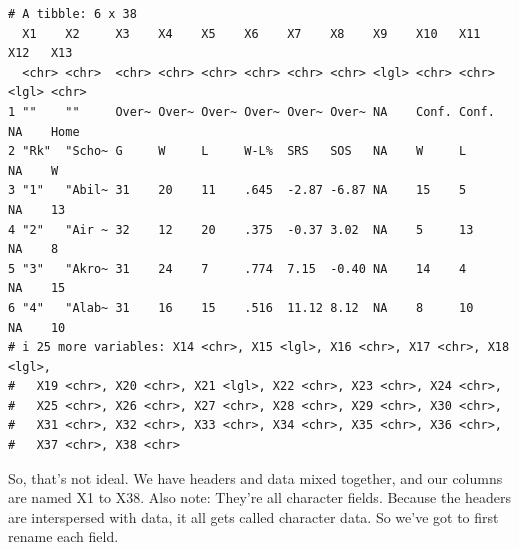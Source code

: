 \documentclass[
  letterpaper,
  DIV=11,
  numbers=noendperiod]{scrreprt}
\begin{document}
\begin{verbatim}
# A tibble: 6 x 38
  X1    X2     X3    X4    X5    X6    X7    X8    X9    X10   X11   X12   X13  
  <chr> <chr>  <chr> <chr> <chr> <chr> <chr> <chr> <lgl> <chr> <chr> <lgl> <chr>
1 ""    ""     Over~ Over~ Over~ Over~ Over~ Over~ NA    Conf. Conf. NA    Home 
2 "Rk"  "Scho~ G     W     L     W-L%  SRS   SOS   NA    W     L     NA    W    
3 "1"   "Abil~ 31    20    11    .645  -2.87 -6.87 NA    15    5     NA    13   
4 "2"   "Air ~ 32    12    20    .375  -0.37 3.02  NA    5     13    NA    8    
5 "3"   "Akro~ 31    24    7     .774  7.15  -0.40 NA    14    4     NA    15   
6 "4"   "Alab~ 31    16    15    .516  11.12 8.12  NA    8     10    NA    10   
# i 25 more variables: X14 <chr>, X15 <lgl>, X16 <chr>, X17 <chr>, X18 <lgl>,
#   X19 <chr>, X20 <chr>, X21 <lgl>, X22 <chr>, X23 <chr>, X24 <chr>,
#   X25 <chr>, X26 <chr>, X27 <chr>, X28 <chr>, X29 <chr>, X30 <chr>,
#   X31 <chr>, X32 <chr>, X33 <chr>, X34 <chr>, X35 <chr>, X36 <chr>,
#   X37 <chr>, X38 <chr>
\end{verbatim}

So, that's not ideal. We have headers and data mixed together, and our
columns are named X1 to X38. Also note: They're all character fields.
Because the headers are interspersed with data, it all gets called
character data. So we've got to first rename each field.
\end{document}
